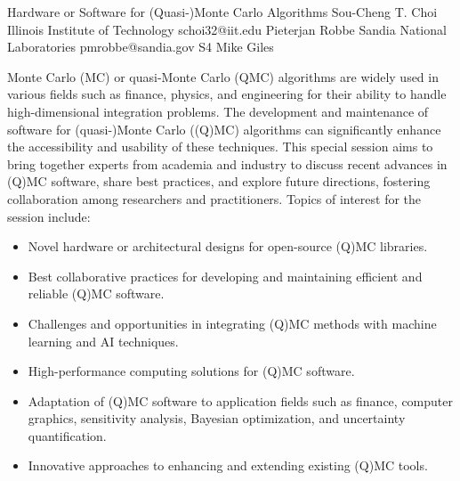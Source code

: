 \begin{session}
 {Hardware or Software for (Quasi-)Monte Carlo Algorithms}%
 {Sou-Cheng T.  Choi}%
 {Illinois Institute of Technology}%
 {schoi32@iit.edu}%
 {Pieterjan Robbe}%
 {Sandia National Laboratories}%
 {pmrobbe@sandia.gov}%
 {S4}%
 {Mike Giles}%

 Monte Carlo (MC) or quasi-Monte Carlo (QMC) algorithms are widely used in various fields such as finance, physics, and engineering for their ability to handle high-dimensional integration problems. The development and maintenance of software for (quasi-)Monte Carlo ((Q)MC) algorithms can significantly enhance the accessibility and usability of these techniques. This special session aims to bring together experts from academia and industry to discuss recent advances in (Q)MC software, share best practices, and explore future directions, fostering collaboration among researchers and practitioners.
 Topics of interest for the session include:
 \begin{itemize}
 \item Novel hardware or architectural designs for open-source (Q)MC libraries.
 \item Best collaborative practices for developing and maintaining efficient and reliable (Q)MC software.
 \item Challenges and opportunities in integrating (Q)MC methods with machine learning and AI techniques.
 \item High-performance computing solutions for (Q)MC software.
 \item Adaptation of (Q)MC software to application fields such as finance, computer graphics, sensitivity analysis, Bayesian optimization, and uncertainty quantification.
 \item Innovative approaches to enhancing and extending existing (Q)MC tools.
 \end{itemize}
\end{session}



\clearpage


